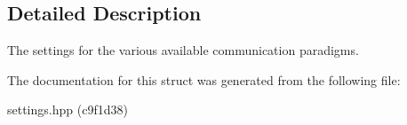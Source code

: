 \subsection{Detailed Description}
The settings for the various available communication paradigms. 

The documentation for this struct was generated from the following file\+:\begin{DoxyCompactItemize}
\item 
settings.\+hpp (c9f1d38)\end{DoxyCompactItemize}
